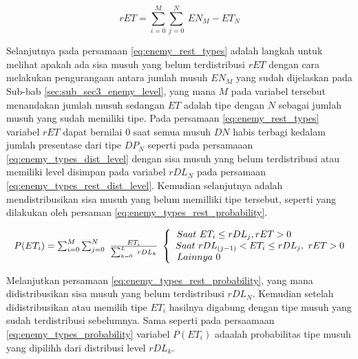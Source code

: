 \begin{equation}\label{eq:enemy_rest_types}
rET = \sum_{i = 0}^{M} \sum_{j = 0}^{N}\ EN_{M} - ET_{N}
\end{equation}

Selanjutnya pada persamaan \ref{eq:enemy_rest_types} adalah langkah untuk melihat apakah ada sisa musuh yang belum terdistribusi $rET$ dengan cara melakukan pengurangaan antara jumlah musuh $EN_{M}$ yang sudah dijelaskan pada Sub-bab \ref{sec:sub_sec3_enemy_level}, yang mana $M$ pada variabel tersebut menandakan jumlah musuh sedangan $ET$ adalah tipe dengan  $N$ sebagai jumlah musuh yang sudah memiliki tipe. Pada persamaan \ref{eq:enemy_rest_types} variabel $rET$ dapat bernilai 0 saat semua musuh $DN$ habis terbagi kedalam jumlah presentase dari tipe $DP_{N}$ seperti pada persamaaan \ref{eq:enemy_types_dist_level} dengan sisa musuh yang belum terdistribusi atau memiliki level disimpan pada variabel $rDL_{N}$ pada persamaan \ref{eq:enemy_types_rest_dist_level}. Kemudian selanjutnya adalah mendistribusikan sisa musuh yang belum memilliki tipe tersebut, seperti yang dilakukan oleh persaman \ref{eq:enemy_types_rest_probability}.
\vspace{1ex}

\begin{equation}\label{eq:enemy_types_rest_probability}
\begin{split}
\resizebox{\columnwidth}{!}{%
	$P(ET_{i}) = \sum_{i = 0}^{M} \sum_{j = 0}^{N}\ \frac{ET_{i}}{\sum_{k = 0}^{L}\ rDL_{k}}\
	\left\{\begin{matrix}
	\hspace{-5.0em} Saat\ ET_{i} \leq rDL_{j}, rET > 0\\
	\hspace{0.5em} Saat\ rDL_{(j-1)} < ET_{i} \leq rDL_{j},\ rET > 0\\
	\hspace{-12.5em} Lainnya\ 0
	\end{matrix}\right.$%
}
\end{split}
\end{equation}

Melanjutkan persamaan \ref{eq:enemy_types_rest_probability}, yang mana didistribusikan sisa musuh yang belum terdistribusi $rDL_{N}$. Kemudian setelah didistribusikan atau memilih tipe $ET_{i}$ hasilnya digabung dengan tipe musuh yang sudah terdistribusi sebelumnya. Sama seperti pada persaamaan \ref{eq:enemy_types_probability} variabel $P(ET_{i})$ adaalah probabilitas tipe musuh yang dipilihh dari distribusi level $rDL_{k}$.
\vspace{1ex}

